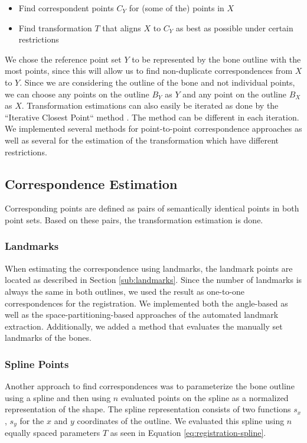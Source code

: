 \documentclass[pdftex,12pt,a4paper]{report}
\begin{document}
\begin{itemize}
\item Find correspondent points $C_Y$ for (some of the) points in $X$
\item Find transformation $T$ that aligns $X$ to $C_Y$ as best as possible under certain restrictions
\end{itemize}

We chose the reference point set $Y$ to be represented by the bone outline with the most points, since this will allow
us to find non-duplicate correspondences from $X$ to $Y$. Since we are considering the outline of the bone and not
individual points, we can choose any points on the outline $B_Y$ as $Y$ and any point on the outline $B_X$ as $X$.
Transformation estimations can also easily be iterated as done by the ``Iterative Closest Point`` method \cite{besl1992method}.
The method can be different in each iteration. We implemented several methods for point-to-point correspondence
approaches as well as several for the estimation of the transformation which have different restrictions.

\subsection{Correspondence Estimation}

Corresponding points are defined as pairs of semantically identical points in both point sets. Based on these
pairs, the transformation estimation is done.

\subsubsection{Landmarks}

When estimating the correspondence using landmarks, the landmark points are located as described in Section
\ref{sub:landmarks}. Since the number of landmarks is always the same in both outlines, we used the result
as one-to-one correspondences for the registration. We implemented both the angle-based as well as the
space-partitioning-based approaches of the automated landmark extraction. Additionally, we added a method
that evaluates the manually set landmarks of the bones.

\subsubsection{Spline Points}

Another approach to find correspondences was to parameterize the bone outline using a spline and then using $n$
evaluated points on the spline as a normalized representation of the shape. The spline representation consists
of two functions $s_x$, $s_y$ for the $x$ and $y$ coordinates of the outline. We evaluated this spline using $n$
equally spaced parameters $T$ as seen in Equation \ref{eq:registration-spline}.
\end{document}
